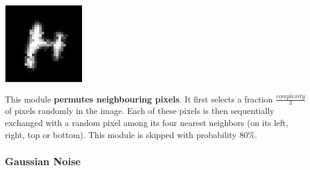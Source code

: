 \documentclass{article} %
\begin{document}
\begin{minipage}[t]{0.14\textwidth}
\begin{center}
\vspace*{1mm}
\includegraphics[scale=.4]{images/Permutpixel_only.png}
\end{center}
\end{minipage}%
\hspace{3mm}\begin{minipage}[t]{0.86\linewidth}
\vspace*{1mm}
This module {\bf permutes neighbouring pixels}. It first selects a
fraction $\frac{complexity}{3}$ of pixels randomly in the image. Each
of these pixels is then sequentially exchanged with a random pixel
among its four nearest neighbors (on its left, right, top or bottom).
This module is skipped with probability 80\%.\\
\end{minipage}


\subsubsection*{Gaussian Noise}
\end{document}
